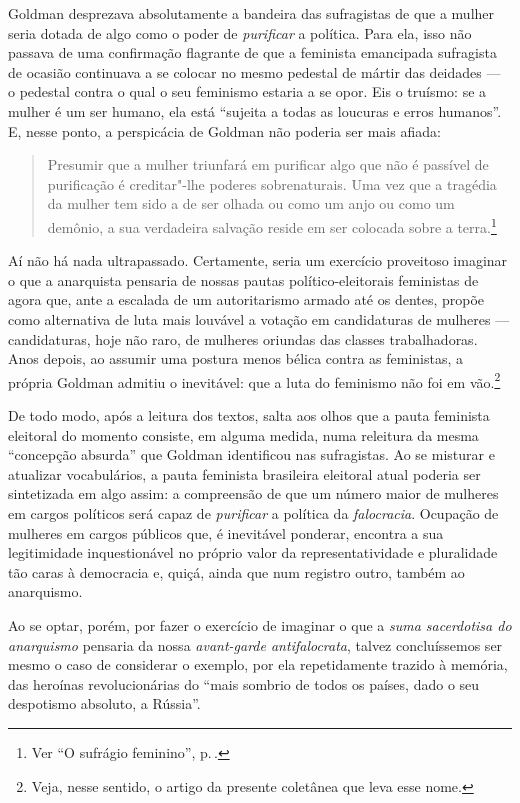 Goldman desprezava absolutamente a
bandeira das sufragistas de que a mulher seria dotada de algo como o
poder de \textit{purificar} a política. Para ela, isso não passava de
uma confirmação flagrante de que a feminista emancipada sufragista de
ocasião continuava a se colocar no mesmo pedestal de mártir das deidades
--- o pedestal contra o qual o seu feminismo estaria a se
opor. Eis o truísmo: se a mulher é um ser humano, ela está ``sujeita a
todas as loucuras e erros humanos''. E, nesse ponto, a perspicácia de
Goldman não poderia ser mais afiada:

\begin{quote}
Presumir que a mulher triunfará em
purificar algo que não é passível de purificação é creditar"-lhe poderes
sobrenaturais. Uma vez que a tragédia da mulher tem sido a de ser olhada
ou como um anjo ou como um demônio, a sua verdadeira salvação reside em ser
colocada sobre a terra.\footnote{Ver ``O sufrágio feminino'', p.\,\pageref{purificar}.}
\end{quote}

Aí não há nada ultrapassado. Certamente, seria um exercício proveitoso
imaginar o que a anarquista pensaria de nossas pautas
político-eleitorais feministas de agora que, ante a escalada de um
autoritarismo armado até os dentes, propõe como alternativa de luta mais
louvável a votação em candidaturas de mulheres --- candidaturas,
hoje não raro, de mulheres oriundas das classes trabalhadoras.
Anos depois, ao assumir uma postura menos bélica contra as feministas, a
própria Goldman admitiu o inevitável: que a luta do feminismo não foi em
vão.\footnote{Veja, nesse sentido, o artigo da presente coletânea que leva esse
nome.}

De todo modo, após a leitura dos textos,
salta aos olhos que a pauta feminista eleitoral do
momento consiste, em alguma medida, numa releitura da mesma ``concepção
absurda'' que Goldman identificou nas sufragistas. Ao se misturar e
atualizar vocabulários, a pauta feminista brasileira eleitoral atual poderia ser sintetizada em algo assim: a compreensão de
que um número maior de mulheres em cargos políticos será capaz de
\textit{purificar} a política da \textit{falocracia}. Ocupação de mulheres em
cargos públicos que, é inevitável ponderar, encontra a sua legitimidade
inquestionável no próprio valor da representatividade e pluralidade tão
caras à democracia e, quiçá, ainda que num registro outro, também ao
anarquismo.

Ao se optar, porém, por fazer o exercício de imaginar o
que a \textit{suma sacerdotisa do anarquismo} pensaria da nossa
\textit{avant-garde antifalocrata}, talvez concluíssemos ser mesmo o
caso de considerar o exemplo, por ela repetidamente trazido à memória,
das heroínas revolucionárias do ``mais sombrio de todos os países, dado
o seu despotismo absoluto, a Rússia''. 

